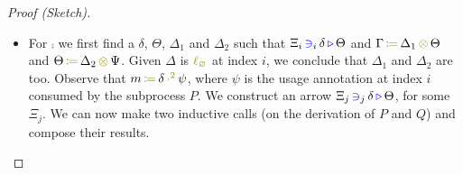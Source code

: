 \begin{proof}[Proof (Sketch)]
\begin{itemize}
    \item
      For $\comp{}{}$ we first find a $\delta$, $\Theta$, $\Delta_1$ and $\Delta_2$ such that $\Xi_i \, \textcolor{blue}{\operatorname{\ni}}_{i} \, \delta \, \textcolor{blue}{\operatorname{\triangleright}} \, \Theta$ and $\opctx{\Gamma}{\Delta_1}{\Theta}$ and $\opctx{\Theta}{\Delta_2}{\Psi}$.
      Given $\Delta$ is $\lz$ at index $i$, we conclude that $\Delta_1$ and $\Delta_2$ are too.
      Observe that $\opsquared{m}{\delta}{\psi}$, where $\psi$ is the usage annotation at index $i$ consumed by the subprocess $P$.
      We construct an arrow $\Xi_j \, \textcolor{blue}{\operatorname{\ni}}_{j} \, \delta \, \textcolor{blue}{\operatorname{\triangleright}} \, \Theta$, for some $\Xi_j$.
      We can now make two inductive calls (on the derivation of $P$ and $Q$) and compose their results.
  \end{itemize}  
\end{proof}